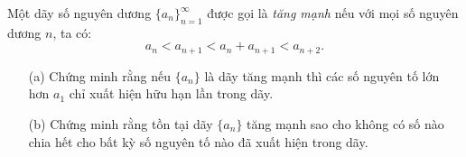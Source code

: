 \ifshowproblem
\begin{problem}\label{example:JPN-2015-MO-P3}
	Một dãy số nguyên dương \( \{a_n\}_{n=1}^{\infty} \) được gọi là \textit{tăng mạnh} nếu với mọi số nguyên dương \( n \), ta có:
	\[
		a_n < a_{n+1} < a_n + a_{n+1} < a_{n+2}.
	\]
	
	\begin{itemize}[topsep=0pt, partopsep=0pt, itemsep=0pt]
		\item[(a)] Chứng minh rằng nếu \( \{a_n\} \) là dãy tăng mạnh thì các số nguyên tố lớn hơn \( a_1 \) chỉ xuất hiện hữu hạn lần trong dãy.
		\item[(b)] Chứng minh rằng tồn tại dãy \( \{a_n\} \) tăng mạnh sao cho không có số nào chia hết cho bất kỳ số nguyên tố nào đã xuất hiện trong dãy.
	\end{itemize}
\end{problem}
\fi

\fi